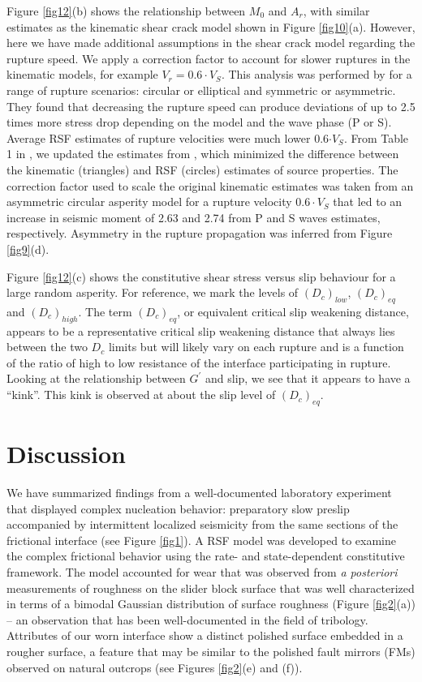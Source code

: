 \documentclass[preprint,1p, 10pt,authoryear]{elsarticle}
\begin{document}
Figure \ref{fig12}(b) shows the relationship between $M_{0}$ and $A_{r}$, with similar estimates as the kinematic shear crack model shown in Figure \ref{fig10}(a). However, here we have made additional assumptions in the shear crack model regarding the rupture speed.  We apply a correction factor to account for slower ruptures in the kinematic models, for example $V_{r} = 0.6\cdot V_{S}$.  This analysis was performed by \citet{Kaneko2015} for a range of rupture scenarios: circular or elliptical and symmetric or asymmetric.  They found that decreasing the rupture speed can produce deviations of up to 2.5 times more stress drop depending on the model and the wave phase (P or S).  Average RSF estimates of rupture velocities were much lower 0.6$\cdot V_{S}$.  From Table 1 in \citet{Kaneko2015}, we updated the estimates from \citet{Selvadurai2019}, which minimized the difference between the kinematic (triangles) and RSF (circles) estimates of source properties.  The correction factor used to scale the original kinematic estimates was taken from an asymmetric circular asperity model for a rupture velocity $0.6\cdot V_{S}$ that led to an increase in seismic moment of 2.63 and 2.74 from P and S waves estimates, respectively.  Asymmetry in the rupture propagation was inferred from Figure \ref{fig9}(d).

Figure \ref{fig12}(c) shows the constitutive shear stress versus slip behaviour for a large random asperity. For reference, we mark the levels of $(D_{c})_{low}$, $(D_{c})_{eq}$ and $(D_{c})_{high}$.  The term $(D_{c})_{eq}$, or equivalent critical slip weakening distance, appears to be a representative critical slip weakening distance that always lies between the two $D_{c}$ limits but will likely vary on each rupture and is a function of the ratio of high to low resistance of the interface participating in rupture. Looking at the relationship between $G^{'}$ and slip, we see that it appears to have a ``kink''.  This kink is observed at about the slip level of  $(D_{c})_{eq}$. 

\section{Discussion}
We have summarized findings from a well-documented laboratory experiment \citep{Selvadurai2015, Selvadurai2017, Selvadurai2019} that displayed complex nucleation behavior: preparatory slow preslip accompanied by intermittent localized seismicity from the same sections of the frictional interface (see Figure \ref{fig1}). A RSF model was developed to examine the complex frictional behavior using the rate- and state-dependent constitutive framework. The model accounted for wear that was observed from \textit{a posteriori} measurements of roughness on the slider block surface that was well characterized in terms of a bimodal Gaussian distribution of surface roughness (Figure \ref{fig2}(a)) -- an observation that has been well-documented in the field of tribology. Attributes of our worn interface show a distinct polished surface embedded in a rougher surface, a feature that may be similar to the polished fault mirrors (FMs) observed on natural outcrops (see Figures \ref{fig2}(e) and (f)).
\end{document}
